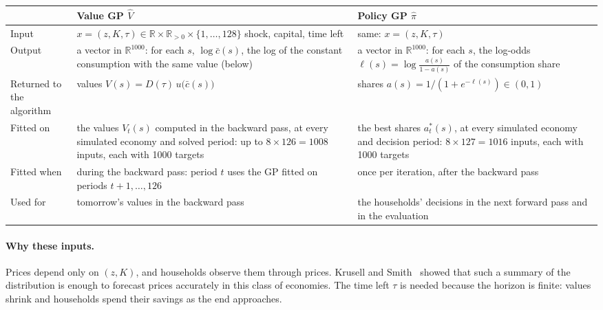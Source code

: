 \documentclass[11pt,a4paper]{article}
\begin{document}
\begin{table}[h]
\centering
\small
\renewcommand{\arraystretch}{1.25}
\begin{tabularx}{\linewidth}{@{}>{\raggedright\arraybackslash}p{2.3cm}>{\raggedright\arraybackslash}X>{\raggedright\arraybackslash}X@{}}
\toprule
 & \textbf{Value GP} $\widehat V$ & \textbf{Policy GP} $\widehat \pi$ \\
\midrule
Input & $x = (z, K, \tau) \in \mathbb R \times \mathbb R_{>0} \times \{1,\ldots,128\}$ \newline
        shock, capital, time left & same: $x = (z, K, \tau)$ \\
Output & a vector in $\mathbb R^{1000}$: for each $s$, $\log \bar c(s)$, the log of the constant
         consumption with the same value (below) & a vector in $\mathbb R^{1000}$: for each $s$, the
         log-odds $\ell(s) = \log\frac{a(s)}{1-a(s)}$ of the consumption share \\
Returned to the algorithm & values $V(s) = D(\tau)\, u\big(\bar c(s)\big)$ &
         shares $a(s) = 1/(1+e^{-\ell(s)}) \in (0,1)$ \\
Fitted on & the values $V_t(s)$ computed in the backward pass, at every simulated economy and solved
            period: up to $8 \times 126 = 1008$ inputs, each with 1000 targets &
            the best shares $a^*_t(s)$, at every simulated economy and decision period:
            $8 \times 127 = 1016$ inputs, each with 1000 targets \\
Fitted when & during the backward pass: period $t$ uses the GP fitted on periods $t+1,\ldots,126$ &
              once per iteration, after the backward pass \\
Used for & tomorrow's values in the backward pass & the households' decisions in the next forward
           pass and in the evaluation \\
\bottomrule
\end{tabularx}
\end{table}

\paragraph{Why these inputs.} Prices depend only on $(z, K)$, and households observe them through
prices. Krusell and Smith~\cite{ks} showed that such a summary of the distribution is enough to
forecast prices accurately in this class of economies. The time left $\tau$ is needed because the
horizon is finite: values shrink and households spend their savings as the end approaches.
\end{document}
